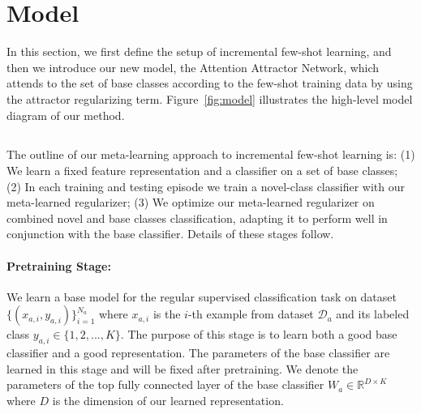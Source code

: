\section{Model}
In this section, we first define the setup of incremental few-shot learning, and then we introduce
our new model, the Attention Attractor Network, which attends to the set of base classes according
to the few-shot training data by using the attractor regularizing term. Figure~\ref{fig:model}
illustrates the high-level model diagram of our method.
\subsection{\ourproblem}
The outline of our meta-learning approach to incremental few-shot learning is: (1) We learn a fixed
feature representation and a classifier on a set of base classes; (2) In each training and testing
episode we train a novel-class classifier with our meta-learned regularizer; (3) We optimize our
meta-learned regularizer on combined novel and base classes classification, adapting it to perform
well in conjunction with the base classifier. Details of these stages follow.

\paragraph{Pretraining Stage:} We learn a base model for the regular supervised classification task
on dataset $\{(x_{a,i},y_{a,i})\}_{i=1}^{N_a}$ where $x_{a,i}$ is the $i$-th example from dataset
$\mathcal{D}_a$ and its labeled class $y_{a,i}\in\{1,2,...,K\}$. The purpose of this stage is to
learn both a good base classifier and a good representation. The parameters of the base classifier
are learned in this stage and will be fixed after pretraining. We denote the parameters of the top
fully connected layer of the base classifier $W_a \in \mathbb{R}^{D\times K}$ where $D$ is the
dimension of our learned representation.
